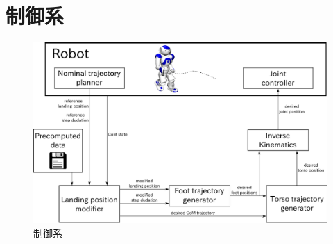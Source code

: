 \documentclass[main]{subfiles}
\begin{document}
\section{制御系}
\begin{figure}[H]
  \centering
  \includegraphics[width = 140 mm]{figure/controller.eps}
  \caption{制御系}
  \label{fig:controller}
\end{figure}
\end{document}

